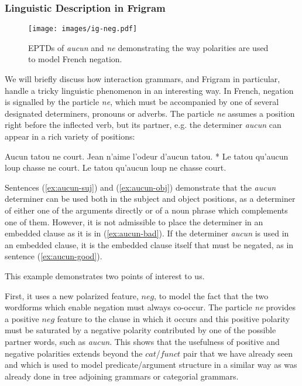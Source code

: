 \subsubsection{Linguistic Description in Frigram}

\begin{figure}
  \centering
  \texttt{[image: images/ig-neg.pdf]}
  \caption{\label{fig:ig-neg} EPTDs of \emph{aucun} and \emph{ne}
    demonstrating the way polarities are used to model French negation.}
\end{figure}

We will briefly discuss how interaction grammars, and Frigram in
particular, handle a tricky linguistic phenomenon in an interesting way.
In French, negation is signalled by the particle \emph{ne}, which must
be accompanied by one of several designated determiners, pronouns or
adverbs. The particle \emph{ne} assumes a position right before the
inflected verb, but its partner, e.g. the determiner \emph{aucun} can
appear in a rich variety of positions:

\begin{exe}
  \ex \label{ex:aucun-suj} Aucun tatou ne court.
  \ex \label{ex:aucun-obj} Jean n'aime l'odeur d'aucun tatou.
  \ex \label{ex:aucun-bad} * Le tatou qu'aucun loup chasse ne court.
  \ex \label{ex:aucun-good} Le tatou qu'aucun loup ne chasse court.
\end{exe}

Sentences (\ref{ex:aucun-suj}) and (\ref{ex:aucun-obj}) demonstrate that
the \emph{aucun} determiner can be used both in the subject and object
positions, as a determiner of either one of the arguments directly or of
a noun phrase which complements one of them. However, it is not
admissible to place the determiner in an embedded clause as it is in
(\ref{ex:aucun-bad}). If the determiner \emph{aucun} is used in an
embedded clause, it is the embedded clause itself that must be negated,
as in sentence (\ref{ex:aucun-good}).

This example demonstrates two points of interest to us.

First, it uses a new polarized feature, $neg$, to model the fact that
the two wordforms which enable negation must always co-occur. The
particle \emph{ne} provides a positive $neg$ feature to the clause in
which it occurs and this positive polarity must be saturated by a
negative polarity contributed by one of the possible partner words, such
as \emph{aucun}. This shows that the usefulness of positive and negative
polarities extends beyond the $cat$/$funct$ pair that we have already
seen and which is used to model predicate/argument structure in a
similar way as was already done in tree adjoining grammars or categorial
grammars.

